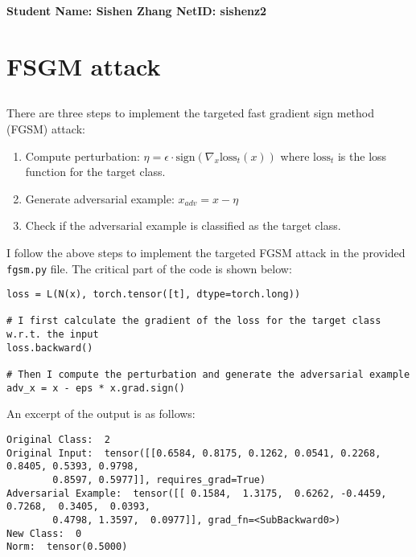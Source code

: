 \documentclass[10pt]{article}
\begin{document}
\vspace*{-0.2in}

\begin{center}
\bf Student Name: Sishen Zhang \hspace{3mm} NetID: sishenz2
\end{center}

\normalsize

\section{FSGM attack}

\subsection{}

There are three steps to implement the targeted fast gradient sign method (FGSM) attack:
\begin{enumerate}
    \item Compute perturbation: $\eta = \epsilon \cdot \text{sign}(\nabla_x \text{loss}_t(x))$ where $\text{loss}_t$ is the loss function for the target class.
    \item Generate adversarial example: $x_{adv} = x - \eta$
    \item Check if the adversarial example is classified as the target class.
\end{enumerate}

I follow the above steps to implement the targeted FGSM attack in the provided \texttt{fgsm.py} file. The critical part of the code is shown below:

\begin{Verbatim}[frame=single]
loss = L(N(x), torch.tensor([t], dtype=torch.long))

# I first calculate the gradient of the loss for the target class w.r.t. the input 
loss.backward()

# Then I compute the perturbation and generate the adversarial example
adv_x = x - eps * x.grad.sign()
\end{Verbatim}

An excerpt of the output is as follows:

\begin{Verbatim}[frame=single]
Original Class:  2
Original Input:  tensor([[0.6584, 0.8175, 0.1262, 0.0541, 0.2268, 0.8405, 0.5393, 0.9798, 
        0.8597, 0.5977]], requires_grad=True)
Adversarial Example:  tensor([[ 0.1584,  1.3175,  0.6262, -0.4459,  0.7268,  0.3405,  0.0393,
        0.4798, 1.3597,  0.0977]], grad_fn=<SubBackward0>)
New Class:  0
Norm:  tensor(0.5000)
\end{Verbatim}
\end{document}

